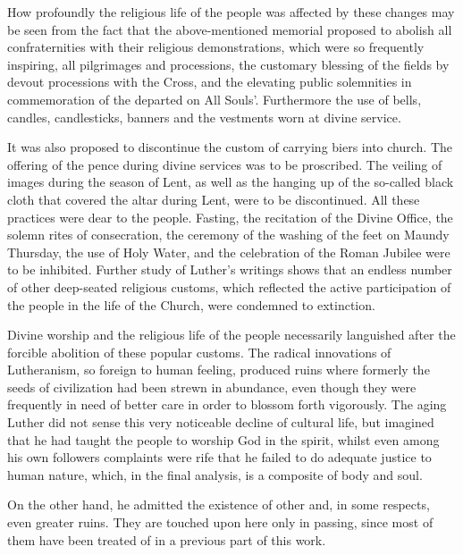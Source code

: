 How profoundly the religious life of the people was affected by these
changes may be seen from the fact that the above-mentioned memorial proposed
to abolish all confraternities with their religious demonstrations, which
were so frequently inspiring, all pilgrimages and processions, the customary
blessing of the fields by devout processions with the Cross, and the elevating
public solemnities in commemoration of the departed on All Souls’. Furthermore
the use of bells, candles, candlesticks, banners and the vestments worn
at divine service.

It was also proposed to discontinue the custom of carrying biers into
church. The offering of the pence during divine services was to be proscribed.
The veiling of images during the season of Lent, as well as the
hanging up of the so-called black cloth that covered the altar during Lent,
were to be discontinued. All these practices were dear to the people. Fasting,
the recitation of the Divine Office, the solemn rites of consecration, the
ceremony of the washing of the feet on Maundy Thursday, the use of Holy
Water, and the celebration of the Roman Jubilee were to be inhibited.
Further study of Luther’s writings shows that an endless number of other
deep-seated religious customs, which reflected the active participation of the
people in the life of the Church, were condemned to extinction.

Divine worship and the religious life of the people necessarily languished
after the forcible abolition of these popular customs. The
radical innovations of Lutheranism, so foreign to human feeling, produced
ruins where formerly the seeds of civilization had been strewn
in abundance, even though they were frequently in need of better
care in order to blossom forth vigorously. The aging Luther did not
sense this very noticeable decline of cultural life, but imagined that
he had taught the people to worship God in the spirit, whilst even
among his own followers complaints were rife that he failed to do
adequate justice to human nature, which, in the final analysis, is a
composite of body and soul.

On the other hand, he admitted the existence of other and, in some
respects, even greater ruins. They are touched upon here only in
passing, since most of them have been treated of in a previous part
of this work.

